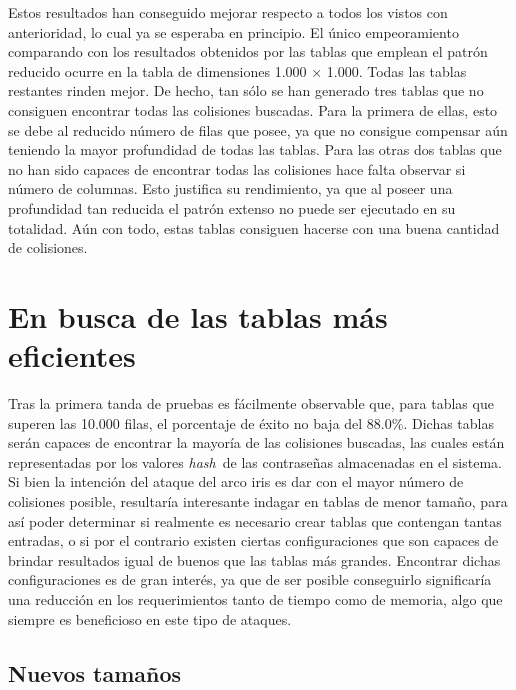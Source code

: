 \documentclass[12pt,spanish,listoffigures,listoftables,listofalgorithms]{tfgetsinf}
\newcommand{\hash}{\textit{hash}}
\begin{document}
Estos resultados han conseguido mejorar respecto a todos los vistos con anterioridad, lo cual ya se esperaba en principio. El único empeoramiento comparando con los resultados obtenidos por las tablas que emplean el patrón reducido ocurre en la tabla de dimensiones 1.000 $\times$ 1.000. Todas las tablas restantes rinden mejor. De hecho, tan sólo se han generado tres tablas que no consiguen encontrar todas las colisiones buscadas. Para la primera de ellas, esto se debe al reducido número de filas que posee, ya que no consigue compensar aún teniendo la mayor profundidad de todas las tablas. Para las otras dos tablas que no han sido capaces de encontrar todas las colisiones hace falta observar si número de columnas. Esto justifica su rendimiento, ya que al poseer una profundidad tan reducida el patrón extenso no puede ser ejecutado en su totalidad. Aún con todo, estas tablas consiguen hacerse con una buena cantidad de colisiones.

\section{En busca de las tablas más eficientes} \label{config perf}

Tras la primera tanda de pruebas es fácilmente observable que, para tablas que superen las 10.000 filas, el porcentaje de éxito no baja del 88.0\%. Dichas tablas serán capaces de encontrar la mayoría de las colisiones buscadas, las cuales están representadas por los valores \hash~de las contraseñas almacenadas en el sistema. Si bien la intención del ataque del arco iris es dar con el mayor número de colisiones posible, resultaría interesante indagar en tablas de menor tamaño, para así poder determinar si realmente es necesario crear tablas que contengan tantas entradas, o si por el contrario existen ciertas configuraciones que son capaces de brindar resultados igual de buenos que las tablas más grandes. Encontrar dichas configuraciones es de gran interés, ya que de ser posible conseguirlo significaría una reducción en los requerimientos tanto de tiempo como de memoria, algo que siempre es beneficioso en este tipo de ataques.

\subsection{Nuevos tamaños} \label{nuevos_tamaños}
\end{document}
